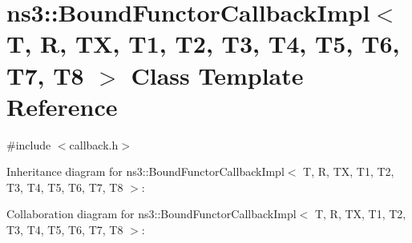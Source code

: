 \hypertarget{classns3_1_1BoundFunctorCallbackImpl}{}\section{ns3\+:\+:Bound\+Functor\+Callback\+Impl$<$ T, R, TX, T1, T2, T3, T4, T5, T6, T7, T8 $>$ Class Template Reference}
\label{classns3_1_1BoundFunctorCallbackImpl}


{\ttfamily \#include $<$callback.\+h$>$}



Inheritance diagram for ns3\+:\+:Bound\+Functor\+Callback\+Impl$<$ T, R, TX, T1, T2, T3, T4, T5, T6, T7, T8 $>$\+:


Collaboration diagram for ns3\+:\+:Bound\+Functor\+Callback\+Impl$<$ T, R, TX, T1, T2, T3, T4, T5, T6, T7, T8 $>$\+:
